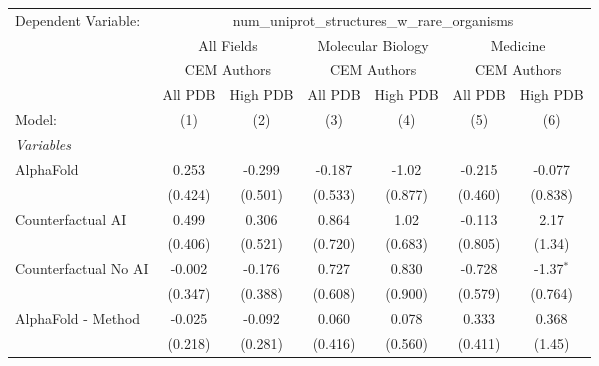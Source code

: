 \begingroup
\centering
\begin{tabular}{lcccccc}
   \tabularnewline \midrule \midrule
   Dependent Variable: & \multicolumn{6}{c}{num\_uniprot\_structures\_w\_rare\_organisms}\\
 & \multicolumn{2}{c}{All Fields} & \multicolumn{2}{c}{Molecular Biology} & \multicolumn{2}{c}{Medicine} \\
\cmidrule(lr){2-3} \cmidrule(lr){4-5} \cmidrule(lr){6-7}
 & \multicolumn{2}{c}{CEM Authors} & \multicolumn{2}{c}{CEM Authors} & \multicolumn{2}{c}{CEM Authors} \\
\cmidrule(lr){2-3} \cmidrule(lr){4-5} \cmidrule(lr){6-7}
 & \multicolumn{1}{c}{All PDB} & \multicolumn{1}{c}{High PDB} & \multicolumn{1}{c}{All PDB} & \multicolumn{1}{c}{High PDB} & \multicolumn{1}{c}{All PDB} & \multicolumn{1}{c}{High PDB} \\
\cmidrule(lr){2-2} \cmidrule(lr){3-3} \cmidrule(lr){4-4} \cmidrule(lr){5-5} \cmidrule(lr){6-6} \cmidrule(lr){7-7}
   Model:                                                     & (1)     & (2)     & (3)           & (4)           & (5)          & (6)\\  
   \midrule
   \emph{Variables}\\
   AlphaFold                                                  & 0.253   & -0.299  & -0.187        & -1.02         & -0.215       & -0.077\\   
                                                              & (0.424) & (0.501) & (0.533)       & (0.877)       & (0.460)      & (0.838)\\   
   Counterfactual AI                                          & 0.499   & 0.306   & 0.864         & 1.02          & -0.113       & 2.17\\   
                                                              & (0.406) & (0.521) & (0.720)       & (0.683)       & (0.805)      & (1.34)\\   
   Counterfactual No AI                                       & -0.002  & -0.176  & 0.727         & 0.830         & -0.728       & -1.37$^{*}$\\   
                                                              & (0.347) & (0.388) & (0.608)       & (0.900)       & (0.579)      & (0.764)\\   
   AlphaFold - Method                                         & -0.025  & -0.092  & 0.060         & 0.078         & 0.333        & 0.368\\   
                                                              & (0.218) & (0.281) & (0.416)       & (0.560)       & (0.411)      & (1.45)\\   

\end{tabular}
